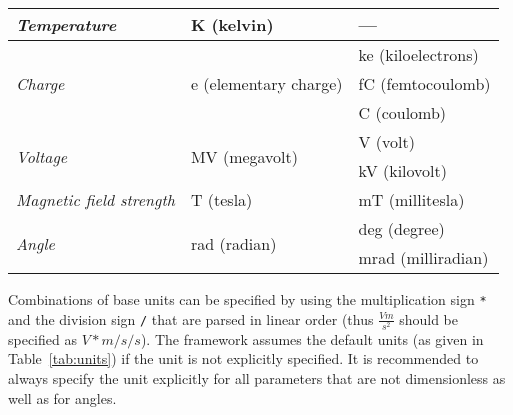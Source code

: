 \begin{table}[tbp]
\begin{tabular}{lll}
\midrule
\textit{Temperature}              & K (kelvin)                              & ---                      \\
\midrule
\multirow{3}{*}{\textit{Charge}}  & \multirow{3}{*}{e (elementary charge)}  & ke (kiloelectrons)       \\
                                  &                                         & fC (femtocoulomb)        \\
                                  &                                         & C (coulomb)              \\
\midrule
\multirow{2}{*}{\textit{Voltage}} & \multirow{2}{*}{MV (megavolt)}          & V (volt)                 \\
                                  &                                         & kV (kilovolt)            \\
\midrule
\textit{Magnetic field strength}  & T (tesla)                               & mT (millitesla)          \\
\midrule
\multirow{2}{*}{\textit{Angle}}   & \multirow{2}{*}{rad (radian)}           & deg (degree)             \\
                                  &                                         & mrad (milliradian)       \\
\bottomrule
\end{tabular}
\end{table}

Combinations of base units can be specified by using the multiplication sign \texttt{*} and the division sign \texttt{/} that are parsed in linear order (thus $\frac{V m}{s^2}$ should be specified as $V*m/s/s$).
The framework assumes the default units (as given in Table~\ref{tab:units}) if the unit is not explicitly specified.
It is recommended to always specify the unit explicitly for all parameters that are not dimensionless as well as for angles.

